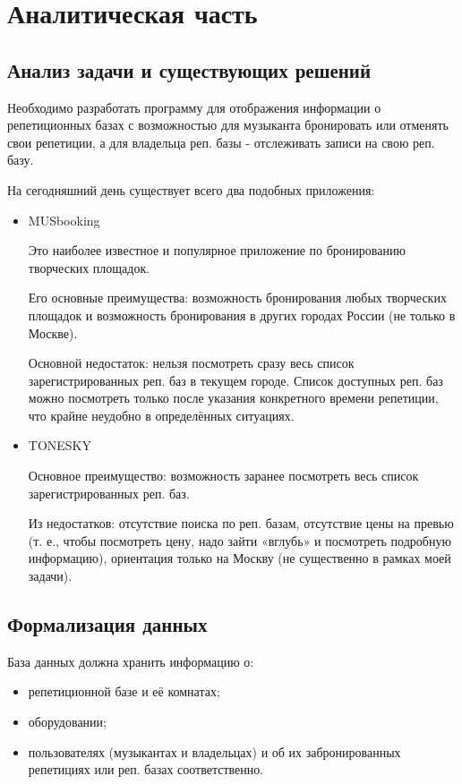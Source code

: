 \section{Аналитическая часть}

\subsection{Анализ задачи и существующих решений}

Необходимо разработать программу для отображения информации о репетиционных базах с возможностью для музыканта бронировать или отменять свои репетиции, а для владельца реп. базы - отслеживать записи на свою реп. базу.

На сегодняшний день существует всего два подобных приложения:
\begin{itemize}
	\item MUSbooking
	
	Это наиболее известное и популярное приложение по бронированию творческих площадок.
	
	Его основные преимущества: возможность бронирования любых творческих площадок и возможность бронирования в других городах России (не только в Москве).
	
	Основной недостаток: нельзя посмотреть сразу весь список зарегистрированных реп. баз в текущем городе. Список доступных реп. баз можно посмотреть только после указания конкретного времени репетиции, что крайне неудобно в определённых ситуациях.
	
	\item TONESKY
	
	Основное преимущество: возможность заранее посмотреть весь список зарегистрированных реп. баз.
	
	Из недостатков: отсутствие поиска по реп. базам, отсутствие цены на превью (т. е., чтобы посмотреть цену, надо зайти «вглубь» и посмотреть подробную информацию), ориентация только на Москву (не существенно в рамках моей задачи).
\end{itemize}

\subsection{Формализация данных}

База данных должна хранить информацию о:

\begin{itemize}
	\item репетиционной базе и её комнатах;
	\item оборудовании;
	\item пользователях (музыкантах и владельцах) и об их забронированных репетициях или реп. базах соответственно.
\end{itemize}

